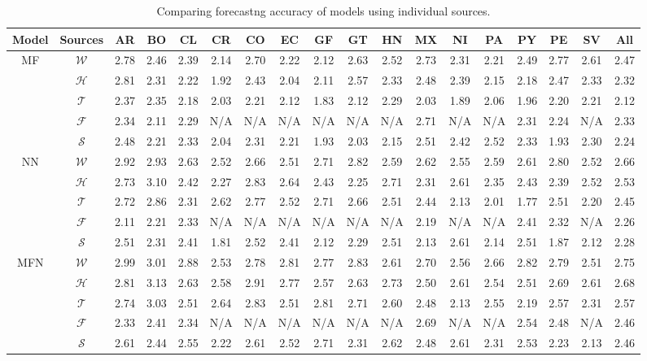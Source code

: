 \begin{table}[tb!]
\centering
\caption{\label{tb:comparison_single}  Comparing forecastng accuracy of models using individual sources.}
\vspace{1em}
\footnotesize
\begin{tabular}{|*{18}{c|}}
\hline
Model               & Sources       & AR & BO & CL & CR & CO & EC & GF & GT & HN & MX & NI & PA & PY & PE & SV & All\\
\hline \hline
\multirow{5}{*}{MF} & $\mathcal{W}$ &2.78&2.46&2.39&2.14&2.70&2.22&2.12&2.63&2.52&2.73&2.31&2.21&2.49&2.77&2.61&2.47\\ 
                    & $\mathcal{H}$ &2.81&2.31&2.22&1.92&2.43&2.04&2.11&2.57&2.33&2.48&2.39&2.15&2.18&2.47&2.33&2.32\\ 
                    & $\mathcal{T}$ &2.37&2.35&2.18&2.03&2.21&2.12&1.83&2.12&2.29&2.03&1.89&2.06&1.96&2.20&2.21&2.12\\ 
                    & $\mathcal{F}$ &2.34&2.11&2.29& N/A& N/A& N/A& N/A& N/A& N/A&2.71& N/A& N/A&2.31&2.24& N/A&2.33\\ 
                    & $\mathcal{S}$ &2.48&2.21&2.33&2.04&2.31&2.21&1.93&2.03&2.15&2.51&2.42&2.52&2.33&1.93&2.30&2.24 \\ 
\hline
\multirow{5}{*}{NN} & $\mathcal{W}$ &2.92&2.93&2.63&2.52&2.66&2.51&2.71&2.82&2.59&2.62&2.55&2.59&2.61&2.80&2.52&2.66\\ 
                    & $\mathcal{H}$ &2.73&3.10&2.42&2.27&2.83&2.64&2.43&2.25&2.71&2.31&2.61&2.35&2.43&2.39&2.52&2.53\\ 
                    & $\mathcal{T}$ &2.72&2.86&2.31&2.62&2.77&2.52&2.71&2.66&2.51&2.44&2.13&2.01&1.77&2.51&2.20&2.45\\ 
                    & $\mathcal{F}$ &2.11&2.21&2.33& N/A& N/A& N/A& N/A& N/A& N/A&2.19& N/A& N/A&2.41&2.32& N/A&2.26\\ 
                    & $\mathcal{S}$ &2.51&2.31&2.41&1.81&2.52&2.41&2.12&2.29&2.51&2.13&2.61&2.14&2.51&1.87&2.12&2.28 \\ 
\hline
\multirow{5}{*}{MFN}& $\mathcal{W}$ &2.99&3.01&2.88&2.53&2.78&2.81&2.77&2.83&2.61&2.70&2.56&2.66&2.82&2.79&2.51&2.75\\ 
                    & $\mathcal{H}$ &2.81&3.13&2.63&2.58&2.91&2.77&2.57&2.63&2.73&2.50&2.61&2.54&2.51&2.69&2.61&2.68\\ 
                    & $\mathcal{T}$ &2.74&3.03&2.51&2.64&2.83&2.51&2.81&2.71&2.60&2.48&2.13&2.55&2.19&2.57&2.31&2.57\\ 
                    & $\mathcal{F}$ &2.33&2.41&2.34& N/A& N/A& N/A& N/A& N/A& N/A&2.69& N/A& N/A&2.54&2.48& N/A&2.46\\ 
                    & $\mathcal{S}$ &2.61&2.44&2.55&2.22&2.61&2.52&2.71&2.31&2.62&2.48&2.61&2.31&2.53&2.23&2.13&2.46\\ 
\hline
\end{tabular}
\end{table}


